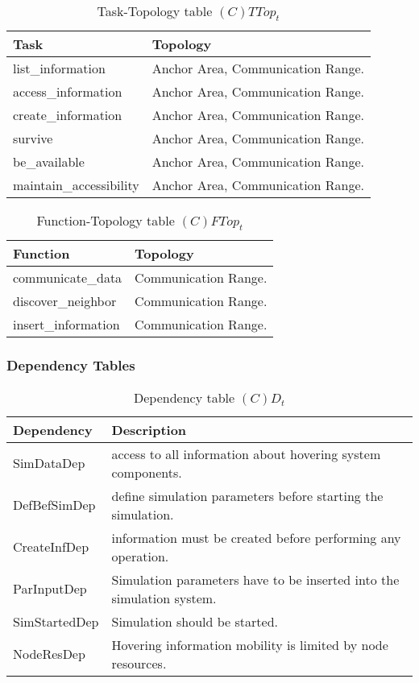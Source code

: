 \begin{table}[H]
	\centering
	\begin{tabular}{|p{4cm}|p{8cm}|}
			\hline
			\textbf{Task} & \textbf{Topology} \\
			\hline
			list\_information & Anchor Area, Communication Range. \\
			\hline
			access\_information& Anchor Area, Communication Range.\\
			\hline
			create\_information & Anchor Area, Communication Range.\\
			\hline
			survive & Anchor Area, Communication Range. \\
			\hline
			be\_available & Anchor Area, Communication Range. \\
			\hline
			maintain\_accessibility & Anchor Area, Communication Range. \\
			\hline
		\end{tabular}
		\caption{Task-Topology table $(C)TTop_t$}
	\label{tab:cttopt}
\end{table}

\begin{table}[H]
	\centering
	\begin{tabular}{|p{4cm}|p{8cm}|}
			\hline
			\textbf{Function} & \textbf{Topology} \\
			\hline
			communicate\_data & Communication Range.\\
			\hline
			discover\_neighbor & Communication Range.\\
			\hline
			insert\_information & Communication Range. \\
			\hline
		\end{tabular}
	\caption{Function-Topology table $(C)FTop_t$}
	\label{tab:cftopt}
\end{table}


\subsubsection{Dependency Tables}

\begin{table}[H]
	\centering
	\begin{tabular}{|p{4cm}|p{8cm}|}
			\hline
			\textbf{Dependency} & \textbf{Description} \\
			\hline
			SimDataDep & access to all information about hovering system
			components. \\
			\hline
			DefBefSimDep & define simulation parameters before starting the
			simulation. \\
			\hline
			CreateInfDep & information must be created before performing any
			operation. \\
			\hline
			ParInputDep & Simulation parameters have to be inserted into the
			simulation system. \\
			\hline
			SimStartedDep & Simulation should be started. \\
			\hline
			NodeResDep & Hovering information mobility is limited by node resources. \\
			\hline
		\end{tabular}
	\caption{Dependency table $(C)D_t$}
	\label{tab:cdt}
\end{table}

